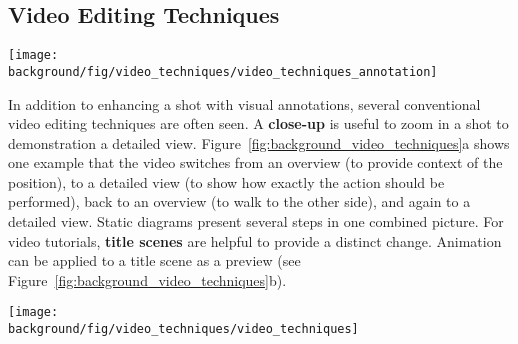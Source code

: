 


\subsection{Video Editing Techniques}

\begin{table*}[!htbp]
  \centering
  \texttt{[image: \\background/fig/video\_techniques/video\_techniques\_annotation]}
  \begin{minipage}{\textwidth}
  \caption[Example annotation techniques used in a video tutorial.]{
    Example annotation techniques used in a video tutorial\footnote{``How to use Loola 3 stroller'' by Maxi-Cosi, \url{https://youtu.be/p6MzLXeWBJw}, licensed under CC BY 2.0}.
  }
  \label{background_video_annotation_techniques}
  \end{minipage}
\end{table*}

In addition to enhancing a shot with visual annotations, several conventional video editing techniques are often seen. A \textbf{close-up} is useful to zoom in a shot to demonstration a detailed view. Figure~\ref{fig:background_video_techniques}a shows one example that the video switches from an overview (to provide context of the position), to a detailed view (to show how exactly the action should be performed), back to an overview (to walk to the other side), and again to a detailed view.
%
Static diagrams present several steps in one combined picture. For video tutorials, \textbf{title scenes} are helpful to provide a distinct change. Animation can be applied to a title scene as a preview (see Figure~\ref{fig:background_video_techniques}b).

\begin{figure*}[h!]
  \centering
  \texttt{[image: \\background/fig/video\_techniques/video\_techniques]}
  \begin{minipage}{\textwidth}
  \caption[Example video editing techniques used in a video tutorial.]{
    Example video editing techniques used in a video tutorial\footnote{``How to use Loola 3 stroller'' by Maxi-Cosi, \url{https://youtu.be/p6MzLXeWBJw}, licensed under CC BY 2.0}:
    (a) a sequence of overview and detailed shots, and
    (b) a title scene to introduce a new section, which can include animation or movement as a preview.
  }
  \label{fig:background_video_techniques}
  \end{minipage}
\end{figure*}

